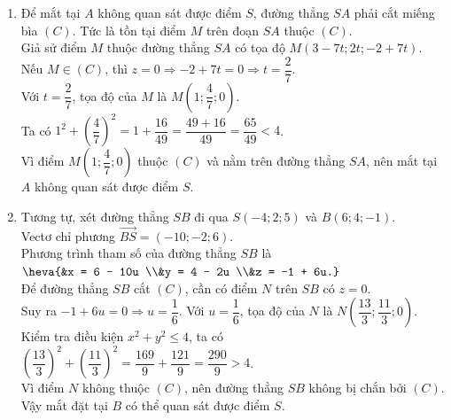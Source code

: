\begin{bt}
{\begin{enumerate}
\item Để mắt tại $A$ không quan sát được điểm $S$, đường thẳng $SA$ phải cắt miếng bìa $(C)$. Tức là tồn tại điểm $M$ trên đoạn $SA$ thuộc $(C)$.\\
Giả sử điểm $M$ thuộc đường thẳng $SA$ có tọa độ $M(3-7t; 2t; -2+7t)$. \\
Nếu $M \in (C)$, thì $z=0 \Rightarrow -2+7t = 0 \Rightarrow t = \dfrac{2}{7}$.\\
Với $t = \dfrac{2}{7}$, tọa độ của $M$ là $M\left( 1; \dfrac{4}{7}; 0 \right)$.\\
Ta có $1^2 + \left(\dfrac{4}{7}\right)^2 = 1 + \dfrac{16}{49} = \dfrac{49+16}{49} = \dfrac{65}{49} < 4$.\\
Vì điểm $M\left(1; \dfrac{4}{7}; 0\right)$ thuộc $(C)$ và nằm trên đường thẳng $SA$, nên mắt tại $A$ không quan sát được điểm $S$.
\item Tương tự, xét đường thẳng $SB$ đi qua $S(-4;2;5)$ và $B(6;4;-1)$. \\
Vectơ chỉ phương $\overrightarrow{BS} = (-10; -2; 6)$.\\
Phương trình tham số của đường thẳng $SB$ là $\heva{&x = 6 - 10u \\&y = 4 - 2u \\&z = -1 + 6u.}$\\
Để đường thẳng $SB$ cắt $(C)$, cần có điểm $N$ trên $SB$ có $z=0$.\\
Suy ra $-1 + 6u = 0 \Rightarrow u = \dfrac{1}{6}$. Với $u = \dfrac{1}{6}$, tọa độ của $N$ là $N\left( \dfrac{13}{3}; \dfrac{11}{3}; 0 \right)$.\\
Kiểm tra điều kiện $x^2 + y^2 \leq 4$, ta có $\left(\dfrac{13}{3}\right)^2 + \left(\dfrac{11}{3}\right)^2 = \dfrac{169}{9} + \dfrac{121}{9} = \dfrac{290}{9} > 4$.\\
Vì điểm $N$ không thuộc $(C)$, nên đường thẳng $SB$ không bị chắn bởi $(C)$. Vậy mắt đặt tại $B$ có thể quan sát được điểm $S$.
\end{enumerate}
}
\end{bt}

